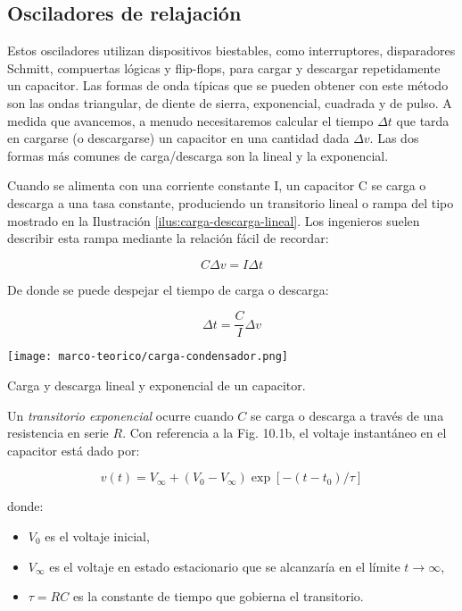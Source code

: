 \subsection{Osciladores de relajación}

Estos osciladores utilizan dispositivos biestables, como interruptores, disparadores Schmitt, compuertas lógicas y flip-flops, para cargar y descargar repetidamente un capacitor. Las formas de onda típicas que se pueden obtener con este método son las ondas triangular, de diente de sierra, exponencial, cuadrada y de pulso. A medida que avancemos, a menudo necesitaremos calcular el tiempo $\Delta t$ que tarda en cargarse (o descargarse) un capacitor en una cantidad dada $\Delta v$. Las dos formas más comunes de carga/descarga son la lineal y la exponencial. \cite[pag. 484]{sergio-franco}

Cuando se alimenta con una corriente constante I, un capacitor C se carga o descarga a una tasa constante, produciendo un transitorio lineal o rampa del tipo mostrado en la Ilustración \ref{ilus:carga-descarga-lineal}. Los ingenieros suelen describir esta rampa mediante la relación fácil de recordar:

\begin{equation}
  C \Delta v = I \Delta t
\end{equation}

De donde se puede despejar el tiempo de carga o descarga:

\begin{equation}
  \Delta t = \frac{C }{I} \Delta v
  \label{eq:tiempo_carga-lineal}
\end{equation}

\begin{ilustracion}[ht]
  \centering
  \texttt{[image: marco-teorico/carga-condensador.png]}
  \caption{Carga y descarga lineal y exponencial de un capacitor.}
  \label{ilus:carga-descarga-lineal}
\end{ilustracion}

Un \emph{transitorio exponencial} ocurre cuando $C$ se carga o descarga a través de una resistencia en serie $R$. Con referencia a la Fig. 10.1b, el voltaje instantáneo en el capacitor está dado por:

\[
v(t) = V_\infty + (V_0 - V_\infty) \exp[-(t - t_0)/\tau]
\]

donde:
\begin{itemize}
\item $V_0$ es el voltaje inicial,
\item $V_\infty$ es el voltaje en estado estacionario que se alcanzaría en el límite $t \to \infty$,
\item $\tau = RC$ es la constante de tiempo que gobierna el transitorio.
\end{itemize}


